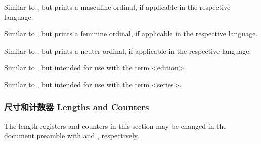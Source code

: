 \begin{ltxsyntax}
Similar to , but prints a masculine ordinal, if applicable in the respective language.


Similar to , but prints a feminine ordinal, if applicable in the respective language.


Similar to , but prints a neuter ordinal, if applicable in the respective language.


Similar to , but intended for use with the term <edition>.


Similar to , but intended for use with the term <series>.

\end{ltxsyntax}

\subsubsection{尺寸和计数器 Lengths and Counters}
\label{use:fmt:len}

The length registers and counters in this section may be changed in the document preamble with  and , respectively.

